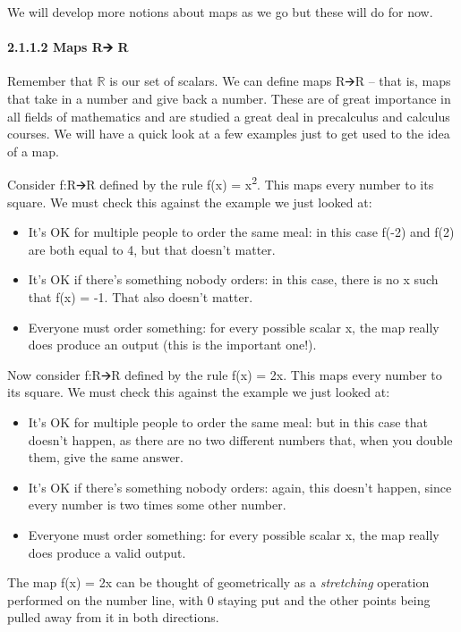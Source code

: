 \documentclass[oneside,english]{amsbook}
\numberwithin{section}{chapter}
\theoremstyle{plain}
\theoremstyle{definition}
\begin{document}
We will develop more notions about maps as we go but these will do for
now.

\paragraph{2.1.1.2 Maps R🡪 R}\label{maps-r-r}

Remember that $\mathbb{R}$ is our set of scalars. We can define maps R🡪R
-- that is, maps that take in a number and give back a number. These are
of great importance in all fields of mathematics and are studied a great
deal in precalculus and calculus courses. We will have a quick look at a
few examples just to get used to the idea of a map.

Consider f:R🡪R defined by the rule f(x) = x\textsuperscript{2}. This
maps every number to its square. We must check this against the example
we just looked at:

\begin{itemize}
	\item
	It's OK for multiple people to order the same meal: in this case f(-2)
	and f(2) are both equal to 4, but that doesn't matter.
	\item
	It's OK if there's something nobody orders: in this case, there is no
	x such that f(x) = -1. That also doesn't matter.
	\item
	Everyone must order something: for every possible scalar x, the map
	really does produce an output (this is the important one!).
\end{itemize}

Now consider f:R🡪R defined by the rule f(x) = 2x. This maps every number
to its square. We must check this against the example we just looked at:

\begin{itemize}
	\item
	It's OK for multiple people to order the same meal: but in this case
	that doesn't happen, as there are no two different numbers that, when
	you double them, give the same answer.
	\item
	It's OK if there's something nobody orders: again, this doesn't
	happen, since every number is two times some other number.
	\item
	Everyone must order something: for every possible scalar x, the map
	really does produce a valid output.
\end{itemize}

The map f(x) = 2x can be thought of geometrically as a \emph{stretching}
operation performed on the number line, with 0 staying put and the other
points being pulled away from it in both directions.
\end{document}
